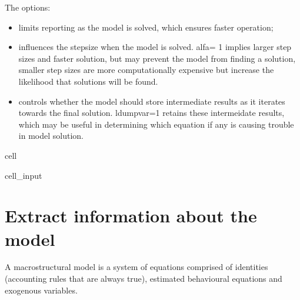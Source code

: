 \documentclass[letterpaper,10pt,english]{jupyterBook}
\begin{document}
\sphinxAtStartPar
The options:
\begin{itemize}
\item {} 
\sphinxAtStartPar
{} limits reporting as the model is solved, which ensures faster operation;

\item {} 
\sphinxAtStartPar
{} influences the step\sphinxhyphen{}size when the model is solved. alfa= 1 implies larger step sizes and faster solution, but may prevent the model from finding a solution, smaller step sizes are more computationally expensive but increase the likelihood that solutions will be found.

\item {} 
\sphinxAtStartPar
{} controls whether the model should store intermediate results as it iterates towards the final solution.  ldumpvar=1 retains these intermeidate results, which may be useful in determining which equation if any is causing trouble in model solution.

\end{itemize}

\begin{sphinxuseclass}{cell}\begin{sphinxVerbatimInput}

\begin{sphinxuseclass}{cell_input}
\begin{sphinxVerbatim}[commandchars=\\\{\}]
  
\end{sphinxVerbatim}

\end{sphinxuseclass}\end{sphinxVerbatimInput}

\end{sphinxuseclass}

\section{Extract information about the model}
\label{\detokenize{content/05_SimpleModel/SimpleModel:extract-information-about-the-model}}
\sphinxAtStartPar
A macrostructural model is a system of equations comprised of identities (accounting rules that are always true), estimated behavioural equations and exogenous variables.
\end{document}
